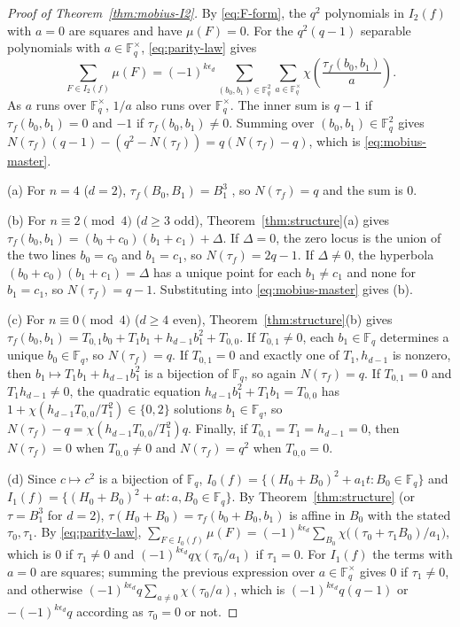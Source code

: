 \documentclass[11pt,a4paper]{amsart}
\theoremstyle{remark}
\numberwithin{equation}{section}
\newcommand{\Fq}{\mathbb{F}_q}
\begin{document}
\begin{proof}[Proof of Theorem~\ref{thm:mobius-I2}]
By \eqref{eq:F-form}, the $q^2$ polynomials in $I_2(f)$ with $a=0$ are squares and have $\mu(F)=0$. For the $q^2(q-1)$
separable polynomials with $a\in\Fq^\times$, \eqref{eq:parity-law} gives
\[
\sum_{F\in I_2(f)}\mu(F)=(-1)^{k\epsilon_d}\sum_{(b_0,b_1)\in\Fq^2}\sum_{a\in\Fq^\times}
\chi\!\left(\frac{\tau_f(b_0,b_1)}{a}\right).
\]
As $a$ runs over $\Fq^\times$, $1/a$ also runs over $\Fq^\times$. The inner sum is $q-1$ if $\tau_f(b_0,b_1)=0$ and
$-1$ if $\tau_f(b_0,b_1)\ne 0$. Summing over $(b_0,b_1)\in\Fq^2$ gives
$N(\tau_f)(q-1)-(q^2-N(\tau_f))=q(N(\tau_f)-q)$, which is \eqref{eq:mobius-master}.

(a) For $n=4$ ($d=2$), $\tau_f(B_0,B_1)=B_1^3$ \cite[Theorem~3.2(a)]{ChenShort}, so $N(\tau_f)=q$ and the sum is $0$.

(b) For $n\equiv 2\pmod 4$ ($d\ge 3$ odd), Theorem~\ref{thm:structure}(a) gives
$\tau_f(b_0,b_1)=(b_0+c_0)(b_1+c_1)+\Delta$. If $\Delta=0$, the zero locus is the union of the two lines $b_0=c_0$ and
$b_1=c_1$, so $N(\tau_f)=2q-1$. If $\Delta\ne 0$, the hyperbola $(b_0+c_0)(b_1+c_1)=\Delta$ has a unique point for each
$b_1\ne c_1$ and none for $b_1=c_1$, so $N(\tau_f)=q-1$. Substituting into \eqref{eq:mobius-master} gives (b).

(c) For $n\equiv 0\pmod 4$ ($d\ge 4$ even), Theorem~\ref{thm:structure}(b) gives
$\tau_f(b_0,b_1)=T_{0,1}b_0+T_1b_1+h_{d-1}b_1^2+T_{0,0}$. If $T_{0,1}\ne 0$, each $b_1\in\Fq$ determines a unique
$b_0\in\Fq$, so $N(\tau_f)=q$. If $T_{0,1}=0$ and exactly one of $T_1,h_{d-1}$ is nonzero, then $b_1\mapsto T_1b_1+h_{d-1}b_1^2$
is a bijection of $\Fq$, so again $N(\tau_f)=q$. If $T_{0,1}=0$ and $T_1h_{d-1}\ne 0$, the quadratic equation
$h_{d-1}b_1^2+T_1b_1=T_{0,0}$ has $1+\chi(h_{d-1}T_{0,0}/T_1^2)\in\{0,2\}$ solutions $b_1\in\Fq$, so
$N(\tau_f)-q=\chi(h_{d-1}T_{0,0}/T_1^2)q$. Finally, if $T_{0,1}=T_1=h_{d-1}=0$, then $N(\tau_f)=0$ when $T_{0,0}\ne 0$
and $N(\tau_f)=q^2$ when $T_{0,0}=0$.

(d) Since $c\mapsto c^2$ is a bijection of $\Fq$, $I_0(f)=\{(H_0+B_0)^2+a_1t:B_0\in\Fq\}$ and
$I_1(f)=\{(H_0+B_0)^2+at:a,B_0\in\Fq\}$. By Theorem~\ref{thm:structure} (or $\tau=B_1^3$ for $d=2$),
$\tau(H_0+B_0)=\tau_f(b_0+B_0,b_1)$ is affine in $B_0$ with the stated $\tau_0,\tau_1$. By \eqref{eq:parity-law},
$\sum_{F\in I_0(f)}\mu(F)=(-1)^{k\epsilon_d}\sum_{B_0}\chi\bigl((\tau_0+\tau_1B_0)/a_1\bigr)$, which is $0$ if
$\tau_1\ne 0$ and $(-1)^{k\epsilon_d}q\chi(\tau_0/a_1)$ if $\tau_1=0$. For $I_1(f)$ the terms with $a=0$ are squares;
summing the previous expression over $a\in\Fq^\times$ gives $0$ if $\tau_1\ne 0$, and otherwise
$(-1)^{k\epsilon_d}q\sum_{a\ne 0}\chi(\tau_0/a)$, which is $(-1)^{k\epsilon_d}q(q-1)$ or $-(-1)^{k\epsilon_d}q$
according as $\tau_0=0$ or not.
\end{proof}
\end{document}

